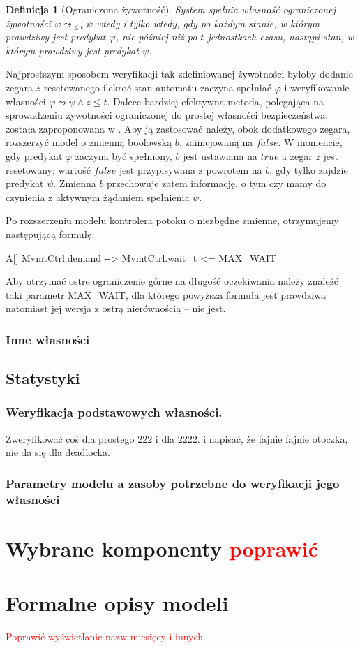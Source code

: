 \documentclass{pracamgr}
\newcommand{\todo}[1]{\textcolor{red}{#1}}
\theoremstyle{plain}
\newtheorem{definition}{Definicja}
\begin{document}
\begin{definition}[Ograniczona żywotność]
  System spełnia własność ograniczonej żywotności $\varphi
  \leadsto_{\leq t} \psi $ wtedy i tylko wtedy, gdy po każdym stanie,
  w którym prawdziwy jest predykat $\varphi$, nie później niż po $t$
  jednostkach czasu, nastąpi stan, w którym prawdziwy jest predykat
  $\psi$.
\end{definition}
Najprostszym sposobem weryfikacji tak zdefiniowanej żywotności byłoby
dodanie zegara $z$ resetowanego ilekroć stan automatu zaczyna
spełniać $\varphi$ i weryfikowanie własności \mbox{$\varphi \leadsto
  \psi \land z \leq t$}. Dalece bardziej efektywna metoda, polegająca
na sprowadzeniu żywotności ograniczonej do prostej własności
bezpieczeństwa, została zaproponowana w \cite{lpw:tacas98}. Aby ją
zastosować należy, obok dodatkowego zegara, rozszerzyć model o zmienną
boolowską $b$, zainicjowaną na $false$.  W momencie, gdy predykat
$\varphi$ zaczyna być spełniony, $b$ jest ustawiana na $true$ a zegar
$z$ jest resetowany; wartość $false$ jest przypisywana z powrotem na
$b$, gdy tylko zajdzie predykat $\psi$. Zmienna $b$ przechowuje zatem
informację, o tym czy mamy do czynienia z aktywnym żądaniem spełnienia
$\psi$.

Po rozszerzeniu modelu kontrolera potoku o niezbędne zmienne,
otrzymujemy następującą formułę:
\begin{center}
\url{A[] MvmtCtrl.demand --> MvmtCtrl.wait_t <= MAX_WAIT}
\end{center}
Aby otrzymać ostre ograniczenie górne na długość oczekiwania należy
znaleźć taki parametr \url{MAX_WAIT}, dla którego powyższa formuła
jest prawdziwa natomiast jej wersja z ostrą nierównością -- nie jest.

\subsection{Inne własności}

\section{Statystyki}

\subsection{Weryfikacja podstawowych własności.}
Zweryfikować coś dla prostego 222 i dla 2222.
i napisać, że fajnie fajnie otoczka,
nie da się dla deadlocka.

\subsection{Parametry modelu a zasoby potrzebne do weryfikacji jego
  własności}

\chapter*{Wybrane komponenty \todo{poprawić}}
\chapter*{Formalne opisy modeli}

{}
\todo{Poprawić wyświetlanie nazw miesięcy i innych.}

\end{document}
